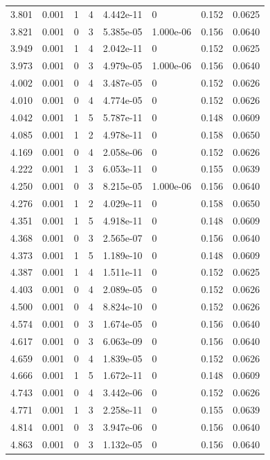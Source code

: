 \documentclass[preview]{standalone}
\begin{document}
{{{\begin{tabular}{L{1.2cm}C{1.2cm} C{0.3cm}C{0.5cm} C{1.4cm}C{1.4cm} C{1.4cm}C{1.4cm}}
  3.801  &  0.001  & 1     &  4 &  4.442e-11  & 0  & 0.152 &  0.0625   \\ 
  3.821  &  0.001  & 0     &  3 &  5.385e-05  & 1.000e-06  & 0.156 &  0.0640   \\ 
  3.949  &  0.001  & 1     &  4 &  2.042e-11  & 0  & 0.152 &  0.0625   \\ 
  3.973  &  0.001  & 0     &  3 &  4.979e-05  & 1.000e-06  & 0.156 &  0.0640   \\ 
  4.002  &  0.001  & 0     &  4 &  3.487e-05  & 0  & 0.152 &  0.0626   \\ 
  4.010  &  0.001  & 0     &  4 &  4.774e-05  & 0  & 0.152 &  0.0626   \\ 
  4.042  &  0.001  & 1     &  5 &  5.787e-11  & 0  & 0.148 &  0.0609   \\ 
  4.085  &  0.001  & 1     &  2 &  4.978e-11  & 0  & 0.158 &  0.0650   \\ 
  4.169  &  0.001  & 0     &  4 &  2.058e-06  & 0  & 0.152 &  0.0626   \\ 
  4.222  &  0.001  & 1     &  3 &  6.053e-11  & 0  & 0.155 &  0.0639   \\ 
  4.250  &  0.001  & 0     &  3 &  8.215e-05  & 1.000e-06  & 0.156 &  0.0640   \\ 
  4.276  &  0.001  & 1     &  2 &  4.029e-11  & 0  & 0.158 &  0.0650   \\ 
  4.351  &  0.001  & 1     &  5 &  4.918e-11  & 0  & 0.148 &  0.0609   \\ 
  4.368  &  0.001  & 0     &  3 &  2.565e-07  & 0  & 0.156 &  0.0640   \\ 
  4.373  &  0.001  & 1     &  5 &  1.189e-10  & 0  & 0.148 &  0.0609   \\ 
  4.387  &  0.001  & 1     &  4 &  1.511e-11  & 0  & 0.152 &  0.0625   \\ 
  4.403  &  0.001  & 0     &  4 &  2.089e-05  & 0  & 0.152 &  0.0626   \\ 
  4.500  &  0.001  & 0     &  4 &  8.824e-10  & 0  & 0.152 &  0.0626   \\ 
  4.574  &  0.001  & 0     &  3 &  1.674e-05  & 0  & 0.156 &  0.0640   \\ 
  4.617  &  0.001  & 0     &  3 &  6.063e-09  & 0  & 0.156 &  0.0640   \\ 
  4.659  &  0.001  & 0     &  4 &  1.839e-05  & 0  & 0.152 &  0.0626   \\ 
  4.666  &  0.001  & 1     &  5 &  1.672e-11  & 0  & 0.148 &  0.0609   \\ 
  4.743  &  0.001  & 0     &  4 &  3.442e-06  & 0  & 0.152 &  0.0626   \\ 
  4.771  &  0.001  & 1     &  3 &  2.258e-11  & 0  & 0.155 &  0.0639   \\ 
  4.814  &  0.001  & 0     &  3 &  3.947e-06  & 0  & 0.156 &  0.0640   \\ 
  4.863  &  0.001  & 0     &  3 &  1.132e-05  & 0  & 0.156 &  0.0640   \\ 
\hline 
\end{tabular} 

}}}
\end{document}
